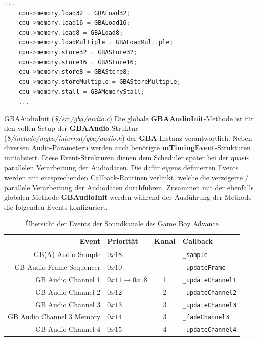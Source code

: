 \documentclass[11pt,a4paper]{scrartcl}
\begin{document}
\vspace{5mm}
\begin{lstlisting}[language=C++, caption={Ausschnitt aus der \textbf{GBAMemoryInit}-Methode}, label={list:GBAMemoryInit}]
    ...
    cpu->memory.load32 = GBALoad32;
    cpu->memory.load16 = GBALoad16;
    cpu->memory.load8 = GBALoad8;
    cpu->memory.loadMultiple = GBALoadMultiple;
    cpu->memory.store32 = GBAStore32;
    cpu->memory.store16 = GBAStore16;
    cpu->memory.store8 = GBAStore8;
    cpu->memory.storeMultiple = GBAStoreMultiple;
    cpu->memory.stall = GBAMemoryStall;
    ...
\end{lstlisting}

\vspace{5mm}
\large GBAAudioInit \normalsize(\textit{\$/src/gba/audio.c})
\vspace{2mm}\newline
Die globale \textbf{GBAAudioInit}-Methode ist f\"ur den vollen Setup der \textbf{GBAAudio}-Struktur (\textit{\$/include/mgba/internal/gba/audio.h}) der \textbf{GBA}-Instanz verantwortlich. Neben diversen Audio-Parametern werden auch ben\"otigte \textbf{mTimingEvent}-Strukturen initialisiert. Diese Event-Strukturen dienen dem Scheduler sp\"ater bei der quasi-parallelen Verarbeitung der Audiodaten. Die daf\"ur eigens definierten Events werden mit entsprechenden Callback-Routinen verlinkt, welche die verz\"ogerte / parallele Verarbeitung der Audiodaten durchf\"uhren. Zusammen mit der ebenfalls globalen Methode \textbf{GBAudioInit} werden w\"ahrend der Ausf\"uhrung der Methode die folgenden Events konfiguriert.

\begin{table}[h]
    \centering
    \begin{tabular}{ r | p{3cm} | c | p{7cm} }
        \textbf{Event} & \textbf{Priorit\"at} & \textbf{Kanal} & \textbf{Callback} \\
        \hline
        GB(A) Audio Sample & $0x18$ & & \verb|_sample| \\
        \hline
        GB  Audio Frame Sequencer & $0x10$ & & \verb|_updateFrame| \\
        \hline
        GB Audio Channel 1 & $0x11 \rightarrow 0x18$ & 1 & \verb|_updateChannel1|  \\
        \hline
        GB Audio Channel 2 & $0x12$ & 2 & \verb|_updateChannel2| \\
        \hline
        GB Audio Channel 3 & $0x13$ & 3 & \verb|_updateChannel3| \\
        \hline
        GB Audio Channel 3 Memory & $0x14$ & 3 & \verb|_fadeChannel3| \\
        \hline
        GB Audio Channel 4 & $0x15$ & 4 & \verb|_updateChannel4| \\
    \end{tabular}
    \caption{\"Ubersicht der Events der Soundkan\"ale des Game Boy Advance}
    \label{table:SoundEvents}
\end{table}
\end{document}
